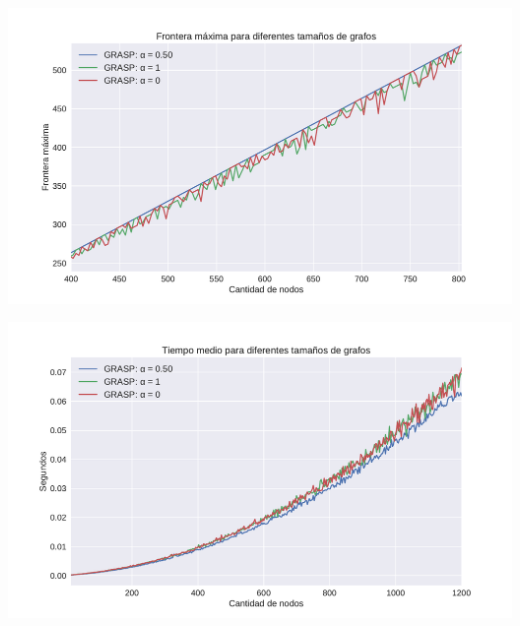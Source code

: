 {\centering
    \includegraphics[width=1\textwidth]{informe/imgs/exp_malo_frontera_grasp_zoom.pdf}
}

{\centering
    \includegraphics[width=1\textwidth]{informe/imgs/exp_malo_tiempo_grasp.pdf}
}

